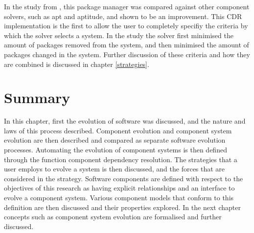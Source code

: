 In the study from \cite{abate2011}, this package manager was compared against other component solvers, such as apt and aptitude, and shown to be an improvement.
This CDR implementation is the first to allow the user to completely specifiy the criteria by which the solver selects a system.
In the study the solver first minimised the amount of packages removed from the system, and then minimised the amount of packages changed in the system.
Further discussion of these criteria and how they are combined is discussed in chapter \ref{strategies}. 

\section{Summary}
In this chapter, first the evolution of software was discussed, and the nature and laws of this process described.
Component evolution and component system evolution are then described and compared as separate software evolution processes.
Automating the evolution of component systems is then defined through the function component dependency resolution.
The strategies that a user employs to evolve a system is then discussed, and the forces that are considered in the strategy.
Software components are defined with respect to the objectives of this research as having explicit relationships and an interface to evolve a component system.
Various component models that conform to this definition are then discussed and their properties explored.
In the next chapter concepts such as component system evolution are formalised and further discussed.  


